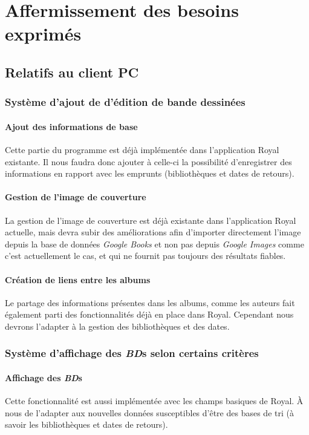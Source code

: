 \section{Affermissement des besoins exprimés} 

\subsection{Relatifs au client PC}
\subsubsection{Système d'ajout de d'édition de bande dessinées}

\paragraph{Ajout des informations de base}
Cette partie du programme est déjà implémentée dans l'application Royal existante. 
Il nous faudra donc ajouter à celle-ci la possibilité d'enregistrer des informations en rapport avec les emprunts (bibliothèques et dates de retours). 

\paragraph{Gestion de l'image de couverture}
La gestion de l'image de couverture est déjà existante dans l'application Royal actuelle,
	mais devra subir des améliorations afin d'importer directement l'image depuis la base de données \emph{Google Books} et non pas depuis \emph{Google Images} comme c'est actuellement le cas,
	et qui ne fournit pas toujours des résultats fiables.

\paragraph{Création de liens entre les albums}	
Le partage des informations présentes dans les albums, comme les auteurs fait également parti des fonctionnalités déjà en place dans Royal. 
Cependant nous devrons l'adapter à la gestion des bibliothèques et des dates. 

\subsubsection{Système d'affichage des \emph{BD}s selon certains critères}

\paragraph{Affichage des \emph{BD}s}
Cette fonctionnalité est aussi implémentée avec les champs basiques de Royal.
À nous de l'adapter aux nouvelles données susceptibles d'être des bases de tri 
(à savoir les bibliothèques et dates de retours). 

